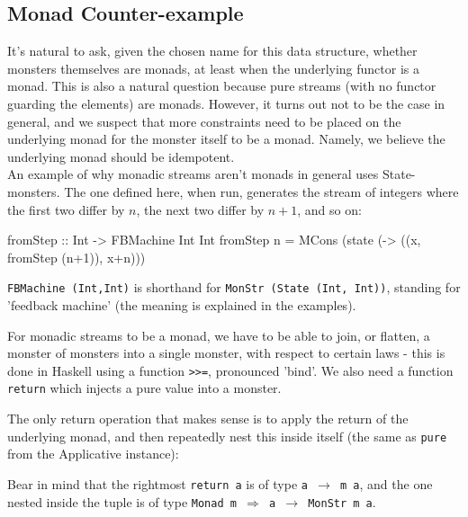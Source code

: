 %

\subsection{Monad Counter-example}

It's natural to ask, given the chosen name for this data structure, whether monsters themselves are monads, at least when the underlying functor is a monad. This is also a natural question because pure streams (with no functor guarding the elements) are monads. However, it turns out not to be the case in general, and we suspect that more constraints need to be placed on the underlying monad for the monster itself to be a monad. Namely, we believe the underlying monad should be idempotent. \\

An example of why monadic streams aren't monads in general uses State-monsters. The one defined here, when run, generates the stream of integers where the first two differ by $n$, the next two differ by $n+1$, and so on:
\begin{haskell}
fromStep :: Int -> FBMachine Int Int
fromStep n = MCons (state (\x -> ((x, fromStep (n+1)), x+n)))
\end{haskell}
\verb+FBMachine (Int,Int)+ is shorthand for \verb+MonStr (State (Int, Int))+, standing for 'feedback machine' (the meaning is explained in the examples).

For monadic streams to be a monad, we have to be able to join, or flatten, a monster of monsters into a single monster, with respect to certain laws - this is done in Haskell using a function \verb+>>=+, pronounced 'bind'. We also need a function \verb+return+ which injects a pure value into a monster.

The only return operation that makes sense is to apply the return of the underlying monad, and then repeatedly nest this inside itself (the same as \verb+pure+ from the Applicative instance):
Bear in mind that the rightmost \verb+return a+ is of type \texttt{a $\to$ m a}, and the one nested inside the tuple is of type \texttt{Monad m $\Rightarrow$ a $\to$ MonStr m a}. \\

